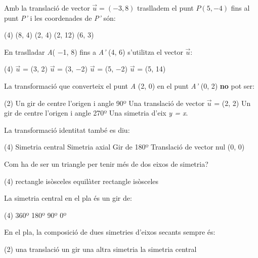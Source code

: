 \newpage
\begin{autoaval}{52}

\begin{mylist}
\exer[2] Amb la translació de vector $\vec u = (-3, 8)$ traslladem el punt  $P (5, -4)$ fins al punt \textit{P'} i les coordenades de \textit{P'} són:
\begin{tasks}(4)
	\task  (8, 4)    
	\task  (2, 4)    
	\task  (2, 12)   
	\task  (6, 3)
\end{tasks}

\exer En traslladar \textit{A}(  $-$1, 8) fins a \textit{A'} (4, 6) s'utilitza el vector $\vec u$:
\begin{tasks}(4)
	\task  $\vec u$ = (3, 2)   
	\task  $\vec u$ = (3, $-$2)   
	\task  $\vec u$ = (5, $-$2)   
	\task  $\vec u$ = (5, 14)  
\end{tasks}

\exer La transformació que converteix el punt \textit{A} (2, 0) en el punt \textit{A'} (0, 2) \textbf{no} pot ser:
\begin{tasks}(2)
	\task  Un gir de centre l'origen i angle 90º  
	\task  Una translació de vector $\vec u$ = (2, 2)
	\task  Un gir de centre l'origen i angle 270º  
	\task  Una simetria d'eix \textit{y = x}.
\end{tasks}

\exer La transformació identitat també es diu:
\begin{tasks}(4)
	\task  Simetria central   
	\task  Simetria axial  
	\task  Gir de 180º   
	\task  Translació de vector nul (0, 0)
\end{tasks}

\exer Com ha de ser un triangle per tenir més de dos eixos de simetria?
\begin{tasks}(4)
	\task  rectangle    
	\task  isòsceles    
	\task  equilàter
	\task  rectangle isòsceles
\end{tasks}

\exer La simetria central en el pla és un gir de:
\begin{tasks}(4)
	\task  360º    
	\task  180º    
	\task  90º    
	\task  0º
\end{tasks}

\exer En el pla, la composició de dues simetries d'eixos secants sempre és:
\begin{tasks}(2)
	\task  una translació   
	\task  un gir   
	\task  una altra simetria  
	\task  la simetria central
\end{tasks}


\end{mylist}
\end{autoaval}
